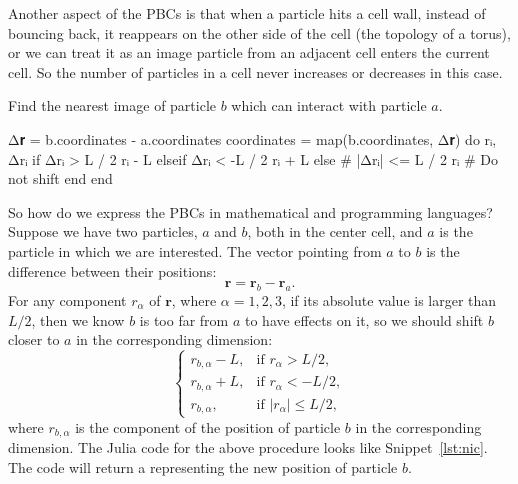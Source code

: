 Another aspect of the PBCs is that when a particle hits a cell wall, instead of bouncing
back, it reappears on the other side of the cell (the topology of a torus), or we can
treat it as an image particle from an adjacent cell enters the current cell.
So the number of particles in a cell never increases or decreases in this case.

\begin{algorithm}
    \caption{Find the nearest image of particle \(b\) which can interact with particle \(a\).}
    \label{lst:nic}
    \begin{juliacode}
        Δ𝐫 = b.coordinates - a.coordinates
        coordinates = map(b.coordinates, Δ𝐫) do rᵢ, Δrᵢ
            if Δrᵢ > L / 2
                rᵢ - L
            elseif Δrᵢ < -L / 2
                rᵢ + L
            else  # |Δrᵢ| <= L / 2
                rᵢ  # Do not shift
            end
        end
    \end{juliacode}
\end{algorithm}

So how do we express the PBCs in mathematical and programming languages?
Suppose we have two particles, \(a\) and \(b\), both in the center cell,
and \(a\) is the particle in which we
are interested. The vector pointing from \(a\) to \(b\) is the difference between
their positions:
%
\begin{equation}
    \bm{r} = \bm{r}_b - \bm{r}_a.
\end{equation}
%
For any component \(r_\alpha\) of \(\bm{r}\), where \(\alpha = 1, 2, 3\), if its absolute value
is larger than \(L / 2\), then we know \(b\) is too far from \(a\) to have effects on it,
so we should shift \(b\) closer to \(a\) in the corresponding dimension:
%
\begin{equation}
    \begin{cases}
        r_{b, \alpha} - L, & \text{if } r_\alpha > L / 2,                  \\
        r_{b, \alpha} + L, & \text{if } r_\alpha < -L / 2,                 \\
        r_{b, \alpha},     & \text{if } \lvert r_\alpha \rvert \leq L / 2,
    \end{cases}
\end{equation}
%
where \(r_{b, \alpha}\) is the component of the position of particle \(b\) in the
corresponding dimension.
The Julia code for the above procedure looks like Snippet~\ref{lst:nic}.
The code will return a  representing the new position of particle \(b\).

